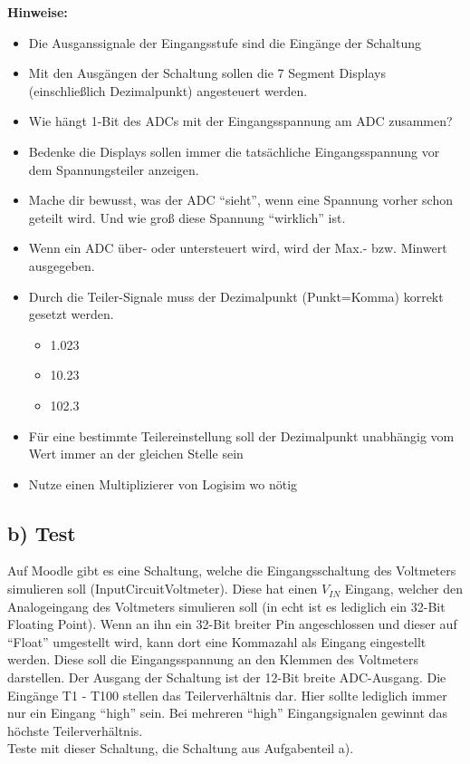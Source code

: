\documentclass[a4paper]{scrartcl}
\begin{document}
\newpage
\textbf{Hinweise:}
\begin{itemize}
  \item Die Ausganssignale der Eingangsstufe sind die Eingänge der Schaltung
  \item Mit den Ausgängen der Schaltung sollen die 7 Segment Displays (einschließlich Dezimalpunkt) angesteuert werden.
  \item Wie hängt 1-Bit des ADCs mit der Eingangsspannung am ADC zusammen?
  \item Bedenke die Displays sollen immer die tatsächliche Eingangsspannung vor dem Spannungsteiler anzeigen.
  \item Mache dir bewusst, was der ADC ``sieht'', wenn eine Spannung vorher schon geteilt wird. Und wie groß diese Spannung ``wirklich'' ist.
  \item Wenn ein ADC über- oder untersteuert wird, wird der Max.- bzw. Minwert ausgegeben.
  \item Durch die Teiler-Signale muss der Dezimalpunkt (Punkt=Komma) korrekt gesetzt werden.
  \begin{itemize}
    \item 1.023
    \item 10.23
    \item 102.3
  \end{itemize}
  \item Für eine bestimmte Teilereinstellung soll der Dezimalpunkt unabhängig vom Wert immer an der gleichen Stelle sein
  \item Nutze einen Multiplizierer von Logisim wo nötig
\end{itemize}

\subsection*{b) Test}
Auf Moodle gibt es eine Schaltung, welche die Eingangsschaltung des Voltmeters simulieren soll (InputCircuitVoltmeter). Diese hat einen $V_{IN}$ Eingang, welcher
den Analogeingang des Voltmeters simulieren soll (in echt ist es lediglich ein 32-Bit Floating Point). Wenn an ihn ein 32-Bit breiter Pin angeschlossen und dieser
auf ``Float'' umgestellt wird, kann dort eine Kommazahl als Eingang eingestellt werden. Diese soll die Eingangsspannung an den Klemmen des Voltmeters darstellen.
Der Ausgang der Schaltung ist der 12-Bit breite ADC-Ausgang.
Die Eingänge T1 - T100 stellen das Teilerverhältnis dar. Hier sollte 
lediglich immer nur ein Eingang ``high'' sein. Bei mehreren ``high'' Eingangsignalen gewinnt das höchste Teilerverhältnis.\\
Teste mit dieser Schaltung, die Schaltung aus Aufgabenteil a). \\
\end{document}
